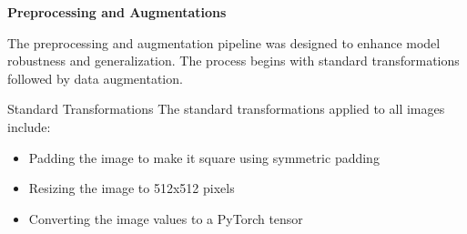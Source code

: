\textbf{Preprocessing and Augmentations}

The preprocessing and augmentation pipeline was designed to enhance model robustness and generalization. The process begins with standard transformations followed by data augmentation.

Standard Transformations
The standard transformations applied to all images include:
\begin{itemize}
    \item Padding the image to make it square using symmetric padding
    \item Resizing the image to 512x512 pixels %
    \item Converting the image values to a PyTorch tensor
\end{itemize}




